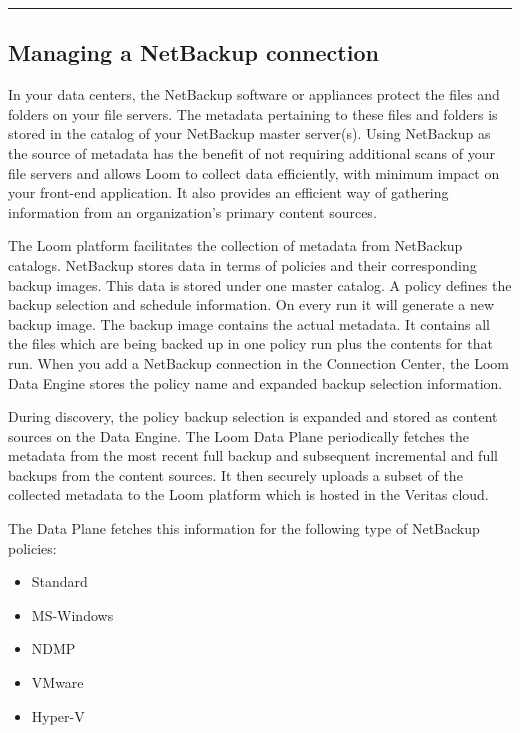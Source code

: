 \documentclass[letterpaper,10pt,english]{sphinxmanual}
\begin{document}
\bigskip\hrule\bigskip



\subsection{Managing a NetBackup connection}
\label{\detokenize{mcdmp_app_ug:managing-a-netbackup-connection}}
In your data centers, the NetBackup software or appliances protect the files and folders on your file servers. The metadata pertaining to these files and folders is stored in the catalog of your NetBackup master server(s). Using NetBackup as the source of metadata has the benefit of not requiring additional scans of your file servers and allows Loom to collect data efficiently, with minimum impact on your front-end application. It also provides an efficient way of gathering information from an organization’s primary content sources.

The Loom platform facilitates the collection of metadata from NetBackup catalogs. NetBackup stores data in terms of policies and their corresponding backup images. This data is stored under one master catalog. A policy defines the backup selection and schedule information. On every run it will generate a new backup image.
The backup image contains the actual metadata. It contains all the files which are being backed up in one policy run plus the contents for that run.
When you add a NetBackup connection in the Connection Center, the Loom Data Engine stores the policy name and expanded backup selection information.

During discovery, the policy backup selection is expanded and stored as content sources on the Data Engine. The Loom Data Plane periodically fetches the metadata from the most recent full backup and subsequent incremental and full backups from the content sources. It then securely uploads a subset of the collected metadata to the Loom platform which is hosted in the Veritas cloud.

The Data Plane fetches this information for the following type of NetBackup policies:
\begin{itemize}
\item {} 
Standard

\item {} 
MS-Windows

\item {} 
NDMP

\item {} 
VMware

\item {} 
Hyper-V

\end{itemize}
\end{document}
